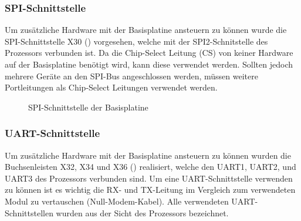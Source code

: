 \subsubsection{SPI-Schnittstelle}
Um zusätzliche Hardware mit der \gls{Basisplatine} ansteuern zu können wurde die SPI-Schnittstelle X30 () vorgesehen, welche mit der SPI2-Schnitstelle des Prozessors verbunden ist. Da die Chip-Select Leitung (CS) von keiner Hardware auf der Basisplatine benötigt wird, kann diese verwendet werden. Sollten jedoch mehrere Geräte an den SPI-Bus angeschlossen werden, müssen weitere Portleitungen als Chip-Select Leitungen verwendet werden.

\begin{figure}[H]
    \centering
    \qquad
    \qquad
    \caption[SPI-Schnittstelle der Basisplatine]{SPI-Schnittstelle der \gls{Basisplatine}}
    \label{fig:basisplatine-spi}
\end{figure}

\subsubsection{UART-Schnittstelle}
Um zusätzliche Hardware mit der \gls{Basisplatine} ansteuern zu können wurden die Buchsenleisten X32, X34 und X36 () realisiert, welche den UART1, UART2, und UART3 des Prozessors verbunden sind. Um eine UART-Schnittstelle verwenden zu können ist es wichtig die RX- und TX-Leitung im Vergleich zum verwendeten Modul zu vertauschen (Null-Modem-Kabel). Alle verwendeten UART-Schnittstellen wurden aus der Sicht des Prozessors bezeichnet.

